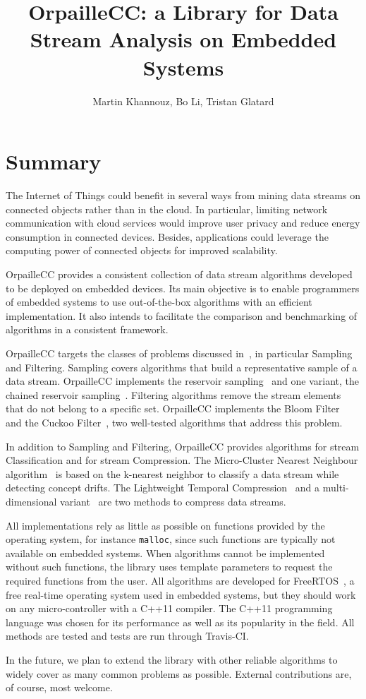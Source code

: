 \documentclass{article}
\title{OrpailleCC: a Library for Data Stream Analysis on Embedded Systems}
\author{Martin Khannouz, Bo Li, Tristan Glatard}
\begin{document}
\maketitle
\section{Summary}

The Internet of Things could benefit in several ways from mining data 
streams on connected objects rather than in the cloud. In particular, 
limiting network communication with cloud services would improve user 
privacy and reduce energy consumption in connected devices. Besides, 
applications could leverage the computing power of connected objects 
for improved scalability.

OrpailleCC provides a consistent collection of data stream algorithms 
developed to be deployed on embedded devices. Its main objective
is to enable programmers of embedded systems to use 
out-of-the-box algorithms with an efficient implementation. It also 
intends to facilitate the comparison and benchmarking of algorithms in a 
consistent framework.

OrpailleCC targets the classes of problems discussed in~\cite{kejariwal2015},
 in particular Sampling and 
Filtering. Sampling covers algorithms that 
build a representative sample of a
data stream. OrpailleCC implements the reservoir
sampling~\cite{reservoir_sampling} and one variant, the chained reservoir
sampling~\cite{chained_reservoir_sampling}. Filtering algorithms
remove the stream elements that do not belong to a specific set.
OrpailleCC implements the Bloom Filter~\cite{bloom} and the Cuckoo
Filter~\cite{cuckoo_filter}, two well-tested algorithms that address this
problem.

In addition to Sampling and Filtering, OrpailleCC
provides algorithms for stream Classification and for stream Compression. The 
Micro-Cluster Nearest Neighbour algorithm~\cite{mc-nn} is based on the 
k-nearest neighbor to classify a data stream while detecting concept 
drifts. The Lightweight Temporal Compression~\cite{ltc} and a 
multi-dimensional variant~\cite{ltcd} are two methods to compress data 
streams.

All implementations rely as little as possible on functions provided by the 
operating system, for instance \texttt{malloc}, since such functions are typically
not available on embedded systems. When algorithms cannot be
implemented without such functions, the library uses template parameters to 
request the required functions from the user.  All algorithms are 
developed for FreeRTOS~\cite{freertos}, a free real-time operating 
system used in embedded systems, but they should work on any 
micro-controller with a C++11 compiler. The C++11 programming language 
was chosen for its performance as well as its popularity in the 
field. All methods are tested and tests are run through Travis-CI.

In the future, we plan to extend the library with other reliable 
algorithms to widely cover as many common problems as possible.
External contributions are, of course, most welcome.




\end{document}
